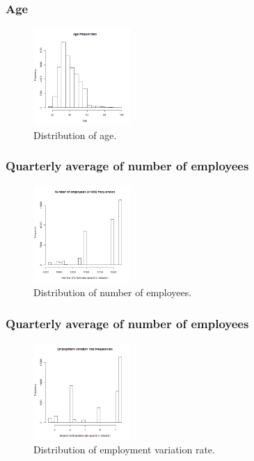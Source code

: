 \documentclass[11pt]{article}
\begin{document}
\begin{multicols}{2}
\newpage
\subsubsection{Age}
\begin{figure}[H]
	\centering
	\includegraphics[width=0.33\textwidth]{images/age}
	\caption{Distribution of age.}
	\label{fig:age}
\end{figure}

\subsubsection{Quarterly average of number of employees}
\begin{figure}[H]
	\centering
	\includegraphics[width=0.33\textwidth]{images/nr_employed}
	\caption{Distribution of number of employees.}
	\label{fig:nr_employed}
\end{figure}

\subsubsection{Quarterly average of number of employees}
\begin{figure}[H]
	\centering
	\includegraphics[width=0.33\textwidth]{images/emp_var_rate}
	\caption{Distribution of employment variation rate.}
	\label{fig:emp_var_rate}
\end{figure}


\end{multicols}
\end{document}
